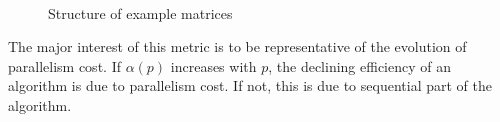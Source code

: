 \documentclass[smallextended]{svjour3}
\begin{document}
\begin{figure}[h!]
{	}\\
	\hspace{1cm}
	\caption{Structure of example matrices}
	\label{matrices}
\end{figure}

The major interest of this metric is to be representative of the evolution of parallelism cost. If $\alpha(p)$ increases with $p$, the declining efficiency of an algorithm is due to parallelism cost. If not, this is due to sequential part of the algorithm.\smallskip
\end{document}
